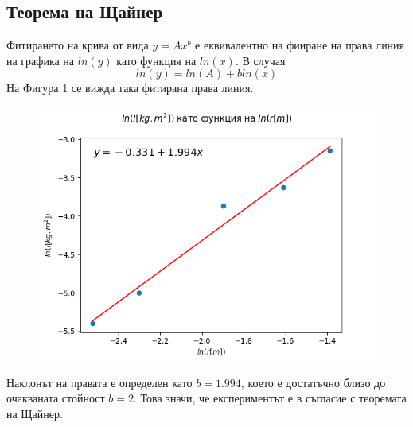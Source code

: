\documentclass[aps, prb, twocolumn, a4paper, floatfix, reprint]{revtex4-2}
\begin{document}
\subsection{Теорема на Щайнер}
Фитирането на крива от вида $y = Ax^b$ е еквивалентно на фииране на права линия на графика на $ln(y)$ като функция на $ln(x)$. В случая 
\begin{equation*}
    ln(y) = ln(A) + bln(x)    
\end{equation*}
На Фигура 1 се вижда така фитирана права линия. 
\begin{figure}[H] \label{fig:1} 
    \centering
    \caption{}
    \includegraphics[width=\columnwidth, keepaspectratio=true]{graph.png}
\end{figure}

Наклонът на правата е определен като $b=1.994$, което е достатъчно близо до очакваната стойност $b=2$. Това значи, че експериментът е в съгласие с теоремата на Щайнер.  
\end{document}

